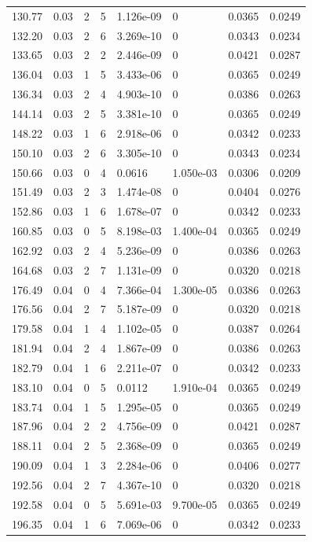 \documentclass[preview]{standalone}
\begin{document}
{{{\begin{tabular}{L{1.2cm}C{1.2cm} C{0.3cm}C{0.5cm} C{1.4cm}C{1.4cm} C{1.4cm}C{1.4cm}}
  130.77  &  0.03  & 2     &  5 &  1.126e-09  & 0  & 0.0365 &  0.0249   \\ 
  132.20  &  0.03  & 2     &  6 &  3.269e-10  & 0  & 0.0343 &  0.0234   \\ 
  133.65  &  0.03  & 2     &  2 &  2.446e-09  & 0  & 0.0421 &  0.0287   \\ 
  136.04  &  0.03  & 1     &  5 &  3.433e-06  & 0  & 0.0365 &  0.0249   \\ 
  136.34  &  0.03  & 2     &  4 &  4.903e-10  & 0  & 0.0386 &  0.0263   \\ 
  144.14  &  0.03  & 2     &  5 &  3.381e-10  & 0  & 0.0365 &  0.0249   \\ 
  148.22  &  0.03  & 1     &  6 &  2.918e-06  & 0  & 0.0342 &  0.0233   \\ 
  150.10  &  0.03  & 2     &  6 &  3.305e-10  & 0  & 0.0343 &  0.0234   \\ 
  150.66  &  0.03  & 0     &  4 &  0.0616  & 1.050e-03  & 0.0306 &  0.0209   \\ 
  151.49  &  0.03  & 2     &  3 &  1.474e-08  & 0  & 0.0404 &  0.0276   \\ 
  152.86  &  0.03  & 1     &  6 &  1.678e-07  & 0  & 0.0342 &  0.0233   \\ 
  160.85  &  0.03  & 0     &  5 &  8.198e-03  & 1.400e-04  & 0.0365 &  0.0249   \\ 
  162.92  &  0.03  & 2     &  4 &  5.236e-09  & 0  & 0.0386 &  0.0263   \\ 
  164.68  &  0.03  & 2     &  7 &  1.131e-09  & 0  & 0.0320 &  0.0218   \\ 
  176.49  &  0.04  & 0     &  4 &  7.366e-04  & 1.300e-05  & 0.0386 &  0.0263   \\ 
  176.56  &  0.04  & 2     &  7 &  5.187e-09  & 0  & 0.0320 &  0.0218   \\ 
  179.58  &  0.04  & 1     &  4 &  1.102e-05  & 0  & 0.0387 &  0.0264   \\ 
  181.94  &  0.04  & 2     &  4 &  1.867e-09  & 0  & 0.0386 &  0.0263   \\ 
  182.79  &  0.04  & 1     &  6 &  2.211e-07  & 0  & 0.0342 &  0.0233   \\ 
  183.10  &  0.04  & 0     &  5 &  0.0112  & 1.910e-04  & 0.0365 &  0.0249   \\ 
  183.74  &  0.04  & 1     &  5 &  1.295e-05  & 0  & 0.0365 &  0.0249   \\ 
  187.96  &  0.04  & 2     &  2 &  4.756e-09  & 0  & 0.0421 &  0.0287   \\ 
  188.11  &  0.04  & 2     &  5 &  2.368e-09  & 0  & 0.0365 &  0.0249   \\ 
  190.09  &  0.04  & 1     &  3 &  2.284e-06  & 0  & 0.0406 &  0.0277   \\ 
  192.56  &  0.04  & 2     &  7 &  4.367e-10  & 0  & 0.0320 &  0.0218   \\ 
  192.58  &  0.04  & 0     &  5 &  5.691e-03  & 9.700e-05  & 0.0365 &  0.0249   \\ 
  196.35  &  0.04  & 1     &  6 &  7.069e-06  & 0  & 0.0342 &  0.0233   \\ 
\hline 
\end{tabular} 

}}}
\end{document}
